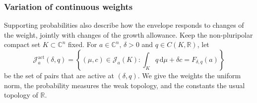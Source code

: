 \subsubsection{Variation of continuous weights}
\label{sec:affine-weight-response}

Supporting probabilities also describe how the envelope responds to changes of the weight, jointly with changes of the growth allowance. Keep the non-pluripolar compact set $K\subset\mathbb C^n$ fixed. For $a\in\mathbb C^n$, $\delta>0$ and $q\in C(K,\mathbb R)$, let
\begin{equation}\label{eq:affine-active-supports}
 \mathcal J^{\mathrm{act}}_a(\delta,q)=
 \left\{(\mu,c)\in\mathcal J_a(K):
   \int_Kq\,\mathrm{d}\mu+\delta c=F_{\delta,q}(a)\right\}
\end{equation}
be the set of pairs that are active at $(\delta,q)$. We give the weights the uniform norm, the probability measures the weak topology, and the constants the usual topology of $\mathbb R$.

